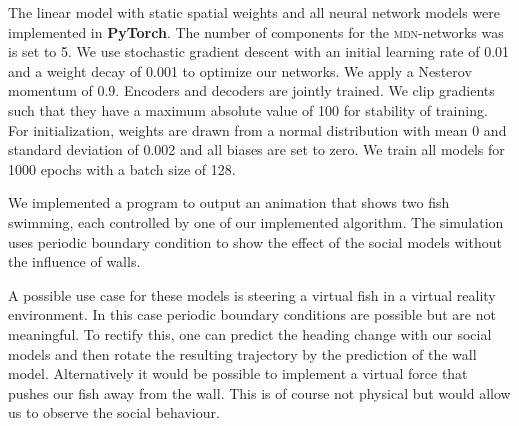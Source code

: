 \documentclass[nobib, a4paper]{tufte-handout}
\begin{document}
The linear model with static spatial weights and all neural network models were implemented in \textbf{PyTorch}.
The number of components for the \textsc{mdn}-networks was is set to 5.
We use stochastic gradient descent with an initial learning rate of 0.01 and a weight decay of 0.001 to optimize our networks.
We apply a Nesterov momentum of 0.9.
Encoders and decoders are jointly trained.
We clip gradients such that they have a maximum absolute value of 100 for stability of training.
For initialization, weights are drawn from a normal distribution with mean 0 and standard deviation of 0.002 and all biases are set to zero.
We train all models for 1000 epochs with a batch size of 128.

We implemented a program to output an animation that shows two fish swimming, each controlled by one of our implemented algorithm.
The simulation uses periodic boundary condition to show the effect of the social models without the influence of walls.

A possible use case for these models is steering a virtual fish in a virtual reality environment.
In this case periodic boundary conditions are possible but are not meaningful.
To rectify this, one can predict the heading change with our social models and then rotate the resulting trajectory by the prediction of the wall model.
Alternatively it would be possible to implement a virtual force that pushes our fish away from the wall.
This is of course not physical but would allow us to observe the social behaviour.
\end{document}
